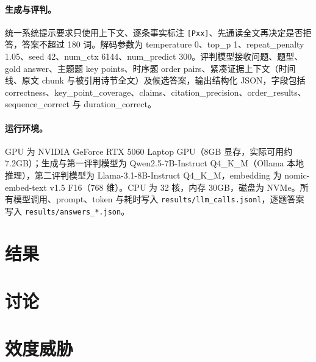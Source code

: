 \documentclass[11pt,a4paper]{ctexart}
\begin{document}
\paragraph{生成与评判。}
统一系统提示要求只使用上下文、逐条事实标注 \texttt{[Pxx]}、先通读全文再决定是否拒答，答案不超过 180 词。解码参数为 temperature 0、top\_p 1、repeat\_penalty 1.05、seed 42、num\_ctx 6144、num\_predict 300。评判模型接收问题、题型、gold answer、主题题 key points、时序题 order pairs、紧凑证据上下文（时间线、原文 chunk 与被引用诗节全文）及候选答案，输出结构化 JSON，字段包括 correctness、key\_point\_coverage、claims、citation\_precision、order\_results、sequence\_correct 与 duration\_correct。

\paragraph{运行环境。}
GPU 为 NVIDIA GeForce RTX 5060 Laptop GPU（8GB 显存，实际可用约 7.2GB）；生成与第一评判模型为 Qwen2.5-7B-Instruct Q4\_K\_M（Ollama 本地推理），第二评判模型为 Llama-3.1-8B-Instruct Q4\_K\_M，embedding 为 nomic-embed-text v1.5 F16（768 维）。CPU 为 32 核，内存 30GB，磁盘为 NVMe。所有模型调用、prompt、token 与耗时写入 \texttt{results/llm\_calls.jsonl}，逐题答案写入 \texttt{results/answers\_*.json}。

\section{结果}
\label{sec:results}


\section{讨论}
\label{sec:discussion}


\section{效度威胁}
\label{sec:threats}
\end{document}
